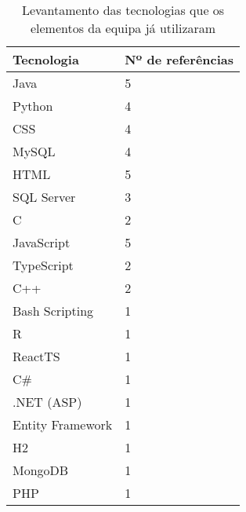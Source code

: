 
\begin{table}[h!tbp]
    \centering
    
    \caption{Levantamento das tecnologias que os elementos da equipa já utilizaram}

    \begin{tabular}{ll}
        \toprule
        Tecnologia & Nº de referências \\
        \midrule
        Java & 5 \\
        Python & 4 \\
        CSS & 4 \\
        MySQL & 4 \\
        HTML & 5 \\
        SQL Server & 3 \\
        C & 2 \\
        JavaScript & 5 \\
        TypeScript & 2 \\
        C++ & 2 \\
        Bash Scripting & 1 \\
        R & 1 \\
        ReactTS & 1 \\
        C\# & 1 \\
        .NET (ASP) & 1 \\
        Entity Framework & 1 \\
        H2 & 1 \\
        MongoDB & 1 \\
        PHP & 1 \\
        \bottomrule
    \end{tabular}


    \label{tab:tecnologias-mais-utilizadas}

\end{table}